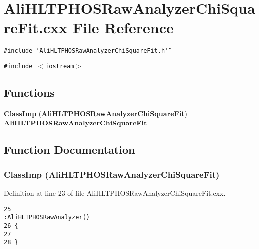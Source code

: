 \section{Ali\-HLTPHOSRaw\-Analyzer\-Chi\-Square\-Fit.cxx File Reference}
\label{AliHLTPHOSRawAnalyzerChiSquareFit_8cxx}


{\tt \#include \char`\"{}Ali\-HLTPHOSRaw\-Analyzer\-Chi\-Square\-Fit.h\char`\"{}}\par
{\tt \#include $<$iostream$>$}\par
\subsection*{Functions}
\begin{CompactItemize}
\item 
{\bf Class\-Imp} ({\bf Ali\-HLTPHOSRaw\-Analyzer\-Chi\-Square\-Fit}) {\bf Ali\-HLTPHOSRaw\-Analyzer\-Chi\-Square\-Fit}
\end{CompactItemize}


\subsection{Function Documentation}
\subsubsection{\setlength{\rightskip}{0pt plus 5cm}Class\-Imp ({\bf Ali\-HLTPHOSRaw\-Analyzer\-Chi\-Square\-Fit})}\label{AliHLTPHOSRawAnalyzerChiSquareFit_8cxx_a0}




Definition at line 23 of file Ali\-HLTPHOSRaw\-Analyzer\-Chi\-Square\-Fit.cxx.

\footnotesize\begin{verbatim}25                                                                                                             :AliHLTPHOSRawAnalyzer()
26 {
27 
28 }
\end{verbatim}\normalsize 



